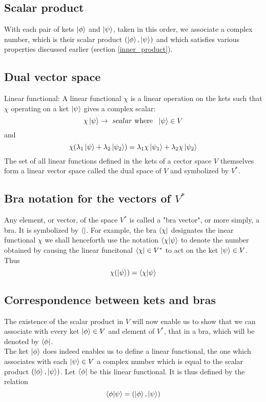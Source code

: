 \subsection{Scalar product}
With each pair of kets $\ket{\phi}$ and $\ket{\psi}$, taken in this order, we associate a complex number, which is their scalar product $(\ket{\phi}, \ket{\psi})$ and which satisfies various properties discussed earlier (section \ref{inner_product}).

\subsection{Dual vector space}
Linear functional: A linear functional $\chi$ is a linear operation on the kets such that $\chi$ operating on a ket $\ket{\psi}$ gives a complex scalar:
\begin{equation}
\chi \ket{\psi} \rightarrow \ scalar \text{ where } \ \ket{\psi} \in V
\end{equation}
and
\begin{equation}
\chi (\lambda_1 \ket{\psi} + \lambda_2 \ket{\psi_2}) = \lambda_1 \chi \ket{\psi_1} + \lambda_2 \chi \ket{\psi_2}
\end{equation}
The set of all linear functions defined in the kets of a cector space $V$ themselves form a linear vector space called the dual space of $V$ and symbolized by $V^*$.

\subsection{Bra notation for the vectors of $V^*$}
Any element, or vector, of the space $V^*$ is called a "bra vector", or more simply, a bra. It is symbolized by $\bra{}$. For example, the bra $\bra{\chi}$ designates the inear functional $\chi$ we shall henceforth use the notation $\braket{\chi}{\psi}$ to denote the number obtained by causing the linear funcitonal $\bra{\chi} \in V^*$ to act on the ket $\ket{\psi} \in V$. Thus
\begin{equation}
\chi (\ket{\psi}) = \braket{\chi}{\psi}
\end{equation}

\subsection{Correspondence between kets and bras}
The existence of the scalar product in $V$ will now enable us to show that we can associate with every ket $\ket{\phi} \in V$ and element of $V^*$, that in a bra, which will be denoted by $\bra{\phi}$.\\
The ket $\ket{\phi}$ does indeed enables us to define a linear functional, the one which associates with each $\ket{\psi} \in V$ a complex number which is equal to the scalar product $(\ket{\phi} , \ket{\psi})$. Let $\bra{\phi}$ be this linear functional. It is thus defined by the relation
\begin{equation}
\braket{\phi}{\psi} = ( \ket{\phi}, \ket{\psi} )
\end{equation}

